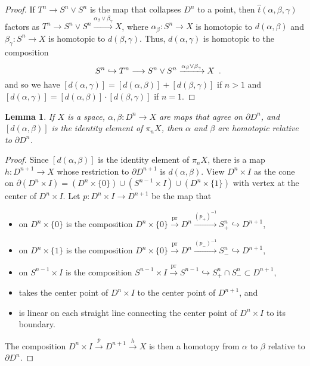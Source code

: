 \documentclass[12pt]{amsart}
\numberwithin{equation}{section}
\theoremstyle{slplain}
\newtheorem{lem}[equation]{Lemma}
\theoremstyle{definition}
\theoremstyle{remark}
\newcommand{\pr}{\mathrm{pr}}
\newcommand{\bdry}{\partial}
\newcommand{\Period}{\rlap{\enspace .}}
\begin{document}
\begin{proof}
  If $T^{n} \to S^{n} \vee S^{n}$ is the map that collapses $D^{n}$ to
  a point, then $\hat t(\alpha,\beta,\gamma)$ factors as $T^{n} \to
  S^{n} \vee S^{n} \xrightarrow{\alpha_{\beta} \vee \beta_{\gamma}}
  X$, where $\alpha_{\beta}\colon S^{n} \to X$ is homotopic to
  $d(\alpha,\beta)$ and $\beta_{\gamma}\colon S^{n} \to X$ is
  homotopic to $d(\beta,\gamma)$.  Thus, $d(\alpha,\gamma)$ is
  homotopic to the composition
  \begin{displaymath}
    S^{n} \hookrightarrow T^{n} \longrightarrow S^{n} \vee S^{n}
    \xrightarrow{\alpha_{\beta} \vee \beta_{\gamma}} X \Period
  \end{displaymath}
  and so we have $[d(\alpha,\gamma)] = [d(\alpha,\beta)] +
  [d(\beta,\gamma)]$ if $n>1$ and $[d(\alpha,\gamma)] =
  [d(\alpha,\beta)] \cdot [d(\beta,\gamma)]$ if $n=1$.
\end{proof}


\begin{lem}
  \label{lem:DskHmtp}
  If $X$ is a space, $\alpha,\beta\colon D^{n} \to X$ are maps that
  agree on $\bdry D^{n}$, and $[d(\alpha,\beta)]$ is the identity
  element of $\pi_{n}X$, then $\alpha$ and $\beta$ are homotopic
  relative to $\bdry D^{n}$.
\end{lem}

\begin{proof}
  Since $[d(\alpha,\beta)]$ is the identity element of $\pi_{n}X$,
  there is a map $h\colon D^{n+1} \to X$ whose restriction to $\bdry
  D^{n+1}$ is $d(\alpha,\beta)$.  View $D^{n}\times I$ as the cone on
  $\bdry(D^{n}\times I) = (D^{n}\times \{0\}) \cup (S^{n-1}\times I)
  \cup (D^{n}\times\{1\})$ with vertex at the center of $D^{n}\times
  I$.  Let $p\colon D^{n}\times I \to D^{n+1}$ be the map that
  \begin{itemize}
  \item on $D^{n}\times \{0\}$ is the composition $D^{n}\times\{0\}
    \xrightarrow{\pr} D^{n} \xrightarrow{(p_{+})^{-1}} S^{n}_{+}
    \hookrightarrow D^{n+1}$,
  \item on $D^{n}\times \{1\}$ is the composition $D^{n}\times\{0\}
    \xrightarrow{\pr} D^{n} \xrightarrow{(p_{-})^{-1}} S^{n}_{-}
    \hookrightarrow D^{n+1}$,
  \item on $S^{n-1}\times I$ is the composition $S^{n-1}\times I
    \xrightarrow{\pr} S^{n-1} \hookrightarrow S^{n}_{+}\cap S^{n}_{-}
    \subset D^{n+1}$,
  \item takes the center point of $D^{n}\times I$ to the center point
    of $D^{n+1}$, and
  \item is linear on each straight line connecting the center point of
    $D^{n}\times I$ to its boundary.
  \end{itemize}
    The composition $D^{n}\times I \xrightarrow{p} D^{n+1}
    \xrightarrow{h} X$ is then a homotopy from $\alpha$ to $\beta$
    relative to $\bdry D^{n}$.
\end{proof}
\end{document}
